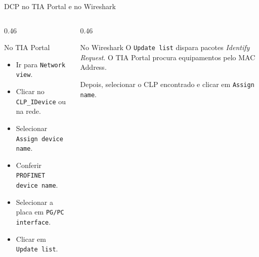 \documentclass[10pt, aspectratio=169]{beamer}
\begin{document}
\begin{frame}{DCP no TIA Portal e no Wireshark}
    \small
    \begin{columns}[T,totalwidth=\textwidth]
        \begin{column}{0.46\textwidth}
            \begin{block}{No TIA Portal}
                \begin{itemize}
                    \item Ir para \texttt{Network view}.
                    \item Clicar no \texttt{CLP\_IDevice} ou na rede.
                    \item Selecionar \texttt{Assign device name}.
                    \item Conferir \texttt{PROFINET device name}.
                    \item Selecionar a placa em \texttt{PG/PC interface}.
                    \item Clicar em \texttt{Update list}.
                \end{itemize}
            \end{block}
        \end{column}
        \begin{column}{0.46\textwidth}
            \begin{block}{No Wireshark}
                O \texttt{Update list} dispara pacotes \textit{Identify Request}. O TIA Portal procura equipamentos pelo MAC Address.

                \vspace{0.25cm}
                Depois, selecionar o CLP encontrado e clicar em \texttt{Assign name}.
            \end{block}
        \end{column}
    \end{columns}
\end{frame}
\end{document}
